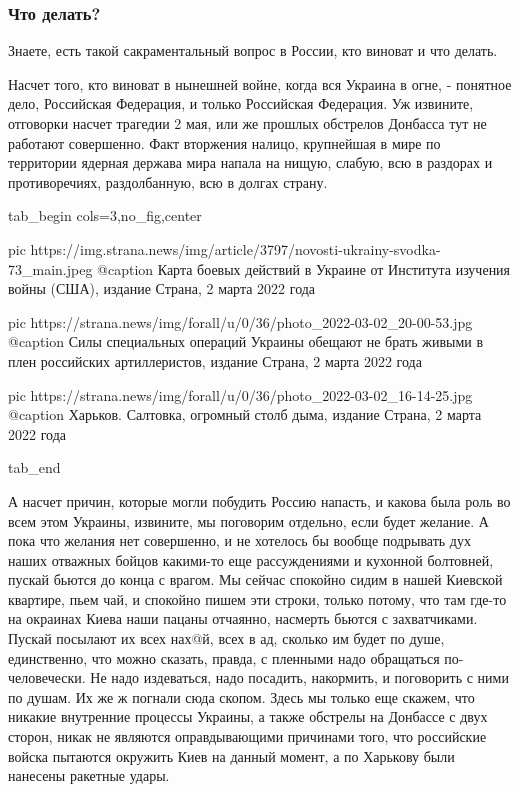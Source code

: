  
 
 
 
 
\subsubsection{Что делать?}

Знаете, есть такой сакраментальный вопрос в России, кто виноват и что делать.

Насчет того, кто виноват в нынешней войне, когда вся Украина в огне, - понятное
дело, Российская Федерация, и только Российская Федерация. Уж извините,
отговорки насчет трагедии 2 мая, или же прошлых обстрелов Донбасса тут не
работают совершенно. Факт вторжения налицо, крупнейшая в мире по территории
ядерная держава мира напала на нищую, слабую, всю в раздорах и противоречиях,
раздолбанную, всю в долгах страну. 

\ifcmt
  tab_begin cols=3,no_fig,center

     pic https://img.strana.news/img/article/3797/novosti-ukrainy-svodka-73_main.jpeg
		 @caption Карта боевых действий в Украине от Института изучения войны (США), издание Страна, 2 марта 2022 года

		 pic https://strana.news/img/forall/u/0/36/photo_2022-03-02_20-00-53.jpg
		 @caption Силы специальных операций Украины обещают не брать живыми в плен российских артиллеристов, издание Страна, 2 марта 2022 года

		 pic https://strana.news/img/forall/u/0/36/photo_2022-03-02_16-14-25.jpg
		 @caption Харьков. Салтовка, огромный столб дыма, издание Страна, 2 марта 2022 года

  tab_end
\fi

А насчет причин, которые могли побудить Россию напасть, и какова была роль во
всем этом Украины, извините, мы поговорим отдельно, если будет желание. А пока
что желания нет совершенно, и не хотелось бы вообще подрывать дух наших
отважных бойцов какими-то еще рассуждениями и кухонной болтовней, пускай бьются
до конца с врагом.  Мы сейчас спокойно сидим в нашей Киевской квартире, пьем
чай, и спокойно пишем эти строки, только потому, что там где-то на окраинах
Киева наши пацаны отчаянно, насмерть бьются с захватчиками. Пускай посылают их
всех нах@й, всех в ад, сколько им будет по душе, единственно, что можно
сказать, правда, с пленными надо обращаться по-человечески. Не надо издеваться,
надо посадить, накормить, и поговорить с ними по душам. Их же ж погнали сюда
скопом. Здесь мы только еще скажем, что никакие внутренние процессы Украины, а
также обстрелы на Донбассе с двух сторон, никак не являются оправдывающими
причинами того, что российские войска пытаются окружить Киев на данный момент,
а по Харькову были нанесены ракетные удары. 

